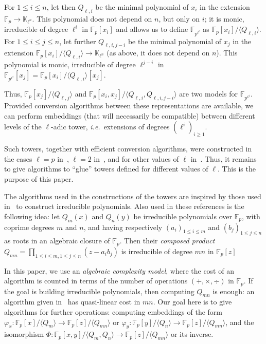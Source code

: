 \documentclass{sig-alternate}
\def\F {\ensuremath{\mathbb{F}}}
\def\K {\ensuremath{\mathbb{K}}}
\newcounter{algo}
\newcommand{\ang}[1]{\langle#1\rangle}
\begin{document}
For $1 \le i \le n$, let then $Q_{\ell,i}$ be the minimal polynomial
of $x_i$ in the extension $\F_p \to \K_{\ell^n}$. This polynomial does
not depend on $n$, but only on $i$; it is monic, irreducible of degree
$\ell^i$ in $\F_p[x_i]$ and allows us to define $\F_{p^{\ell^i}}$ as
$\F_p[x_i]/\ang{Q_{\ell,i}}$.
For $1 \le i \le j \le n$, let further $Q_{\ell,i,j-i}$ be the minimal
polynomial of $x_j$ in the extension $\F_p[x_i]/\ang{Q_{\ell,i}} \to
\K_{\ell^n}$ (as above, it does not depend on $n$). This polynomial is
monic, irreducible of degree $\ell^{j-i}$ in
$\F_{p^{\ell^i}}[x_j]=\F_p[x_i]/\ang{Q_{\ell,i}}[x_j]$.

Thus, $\F_p[x_j]/\ang{Q_{\ell,j}}$ and
$\F_p[x_i,x_j]/\ang{Q_{\ell,i},Q_{\ell,i,j-i}}$ are two models for
$\F_{p^{\ell^j}}$. Provided conversion algorithms between these
representations are available, we can perform embeddings (that will
necessarily be compatible) between different levels of the $\ell$-adic
tower, \emph{i.e.}\ extensions of degrees $(\ell^i)_{i \ge 1}$.

Such towers, together with efficient conversion algorithms, were
constructed in the cases $\ell = p$
in~\cite{cantor89,couveignes00,df+schost12}, $\ell=2$
in~\cite{DoSc12}, and for other values of $\ell$ in~\cite{DeDoSc13}.
Thus, it remains to give algorithms to ``glue'' towers defined for
different values of $\ell$. This is the purpose of this paper.

\smallskip{} The algorithms used
in the constructions of the towers are inspired by those used
in~\cite{Shoup90,shoup94,couveignes+lercier11} to construct
irreducible polynomials. Also used in these references is the
following idea: let $Q_m(x)$ and $Q_n(y)$ be irreducible polynomials
over $\F_p$, with coprime degrees $m$ and $n$, and having respectively
$(a_i)_{1 \le i \le m}$ and $(b_j)_{1 \le j \le n}$ as roots in an
algebraic closure of $\F_p$. Then their {\em composed product}
$Q_{mn} = \prod_{1 \le i \le m, 1 \le j \le n} (z- a_i b_j)$ is
irreducible of degree $mn$ in $\F_p[z]$

In this paper, we use an {\em algebraic complexity model}, where the
cost of an algorithm is counted in terms of the number of operations
$(+,\times,\div)$ in $\F_p$.  If the goal is building irreducible
polynomials, then computing $Q_{mn}$ is enough: an algorithm given
in~\cite{BoFlSaSc06} has quasi-linear cost in $mn$. Our goal here is
to give algorithms for further operations: computing embeddings of the
form $\varphi_x: \F_p[x]/\ang{Q_m}\to \F_p[z]/\ang{Q_{mn}}$ or
$\varphi_y: \F_p[y]/\ang{Q_n}\to \F_p[z]/\ang{Q_{mn}}$, and the
isomorphism $\Phi: \F_p[x,y]/\ang{Q_m,Q_n}\to \F_p[z]/\ang{Q_{mn}}$ or
its inverse.
\end{document}
